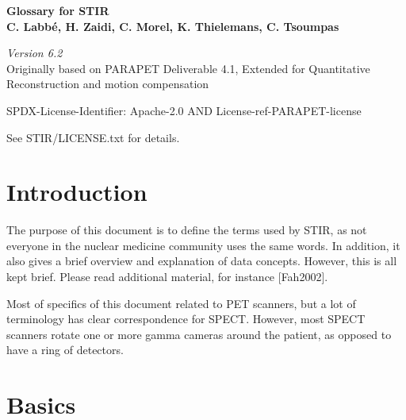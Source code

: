 \documentclass{article}
\begin{document}
\begin{center}
\textbf{{\huge Glossary for STIR}}\\
\textbf{C. Labb\'{e}, H. Zaidi, C. Morel, K. Thielemans, C. Tsoumpas}
\end{center}

\begin{center}
\textit{Version 6.2}\\
Originally based on PARAPET Deliverable 4.1,
Extended for Quantitative Reconstruction and motion compensation

\end{center}

SPDX-License-Identifier: Apache-2.0 AND License-ref-PARAPET-license

See STIR/LICENSE.txt for details.

\section*{Introduction}
The purpose of this document is to define the terms used by STIR, as not everyone in the nuclear 
medicine community uses the same words. In addition, it also gives a brief overview and explanation 
of data concepts. However, this is all kept brief. Please read additional material, for instance
[Fah2002].

Most of specifics of this document related to PET scanners, but a lot of terminology has clear
correspondence for SPECT. However, most SPECT scanners rotate one or more gamma cameras around
the patient, as opposed to have a ring of detectors.

\section*{Basics}
\end{document}
